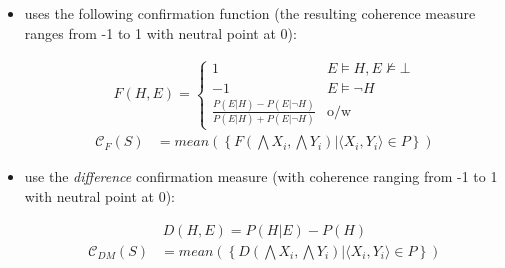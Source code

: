 \documentclass[10pt,]{scrartcl}
\begin{document}
\begin{itemize}

\item \citet{fitelson2003ProbabilisticTheoryCoherence}   uses the following confirmation function (the resulting coherence measure ranges from -1 to 1 with neutral point at 0):

\begin{align*}
    F(H,E) = \begin{cases}
    1 & E\models H, E\not \models \bot \\
    -1 & E \models \neg H\\
    \frac{P(E|H)-P(E|\neg H)}{P(E|H)+P(E|\neg H)} & \mbox{o/w}
    \end{cases}
\end{align*}
\begin{align}
\tag{Fitelson}  
    \mathcal{C}_{F}(S) & =
mean\left(\left\{F(\bigwedge X_i, \bigwedge Y_i) | \langle X_i, Y_i\rangle \in P\right\} \right)
\end{align}






\item  \citet{Douven2007measuring}  use the \textit{difference} confirmation measure (with coherence ranging from -1 to 1 with neutral point at 0):

\begin{align*}
    D(H,E) = P(H|E) - P(H)
\end{align*}
\begin{align}
\tag{DM}  
    \mathcal{C}_{DM}(S) & =
mean\left(\left\{D(\bigwedge X_i, \bigwedge Y_i) | \langle X_i, Y_i\rangle \in P\right\} \right)
\end{align}




\end{itemize}
\end{document}
